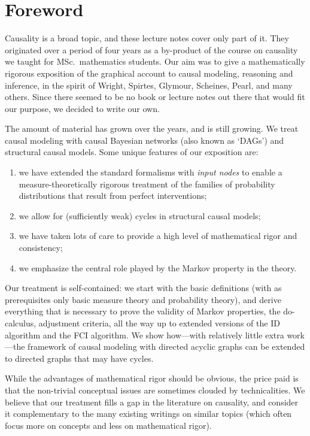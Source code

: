 \section*{Foreword}

Causality is a broad topic, and these lecture notes cover only part of it. 
They originated over a period of four years as a by-product of the course on causality we taught for MSc.\ mathematics students. 
Our aim was to give a mathematically rigorous exposition of the graphical account to causal modeling, reasoning and inference, in the spirit of Wright, Spirtes, Glymour, Scheines, Pearl, and many others. 
Since there seemed to be no book or lecture notes out there that would fit our purpose, we decided to write our own.

The amount of material has grown over the years, and is still growing.
We treat causal modeling with causal Bayesian networks (also known as `DAGs') and structural causal models. 
Some unique features of our exposition are:
\begin{enumerate}
\item we have extended the standard formalisms with \emph{input nodes} to enable a measure-theoretically rigorous treatment of the families of probability distributions that result from perfect interventions;
\item we allow for (sufficiently weak) cycles in structural causal models;
\item we have taken lots of care to provide a high level of mathematical rigor and consistency;
\item we emphasize the central role played by the Markov property in the theory.
\end{enumerate}
Our treatment is self-contained: we start with the basic definitions (with as prerequisites only basic measure theory and probability theory), and derive everything that is necessary to prove the validity of Markov properties, the do-calculus, adjustment criteria, all the way up to extended versions of the ID algorithm and the FCI algorithm.
We show how---with relatively little extra work---the framework of causal modeling with directed acyclic graphs can be extended to directed graphs that may have cycles.

While the advantages of mathematical rigor should be obvious, the price paid is that the non-trivial conceptual issues are sometimes clouded by technicalities.
We believe that our treatment fills a gap in the literature on causality, and consider it complementary to the many existing writings on similar topics (which often focus more on concepts and less on mathematical rigor).

